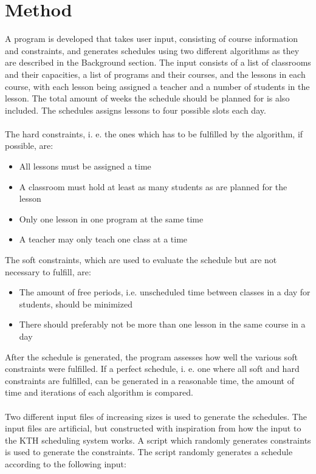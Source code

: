 \documentclass[titlepage,a4paper]{article}
\begin{document}
\section{Method}
A program is developed that takes user input, consisting of course information and constraints, and generates schedules using two different algorithms as they are described in the Background section. The input consists of a list of classrooms and their capacities, a list of programs and their courses, and the lessons in each course, with each lesson being assigned a teacher and a number of students in the lesson. The total amount of weeks the schedule should be planned for is also included.
The schedules assigns lessons to four possible slots each day. \\\\
The hard constraints, i. e. the ones which has to be fulfilled by the algorithm, if possible, are:
\begin{itemize}
  \item All lessons must be assigned a time
  \item A classroom must hold at least as many students as are planned for the lesson
  \item Only one lesson in one program at the same time
  \item A teacher may only teach one class at a time
\end{itemize} 
\medskip
The soft constraints, which are used to evaluate the schedule but are not necessary to fulfill, are:
\begin{itemize}
  \item The amount of free periods, i.e. unscheduled time between classes in a day for students, should be minimized
  \item There should preferably not be more than one lesson in the same course in a day
\end{itemize}
\medskip
After the schedule is generated, the program assesses how well the various soft constraints were fulfilled. If a perfect schedule, i. e. one where all soft and hard constraints are fulfilled, can be generated in a reasonable time, the amount of time and iterations of each algorithm is compared. \\\\
Two different input files of increasing sizes is used to generate the schedules. The input files are artificial, but constructed with inspiration from how the input to the KTH scheduling system works.
A script which randomly generates constraints is used to generate the constraints. The script randomly generates a schedule according to the following input:
\end{document}
